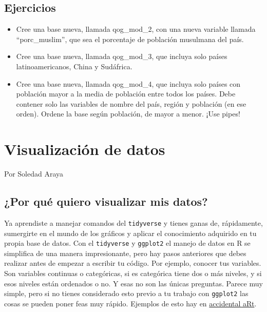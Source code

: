 \documentclass[]{book}
\providecommand{\tightlist}{%
  \setlength{\itemsep}{0pt}\setlength{\parskip}{0pt}}
\begin{document}
\hypertarget{ejercicios-1}{%
\section{Ejercicios}\label{ejercicios-1}}

\begin{itemize}
\tightlist
\item
  Cree una base nueva, llamada qog\_mod\_2, con una nueva variable
  llamada ``porc\_muslim'', que sea el porcentaje de población musulmana
  del país.
\item
  Cree una base nueva, llamada qog\_mod\_3, que incluya solo países
  latinoamericanos, China y Sudáfrica.
\item
  Cree una base nueva, llamada qog\_mod\_4, que incluya solo países con
  población mayor a la media de población entre todos los países. Debe
  contener solo las variables de nombre del país, región y población (en
  ese orden). Ordene la base según población, de mayor a menor. ¡Use
  pipes!
\end{itemize}

\hypertarget{dataviz}{%
\chapter{Visualización de datos}\label{dataviz}}

Por Soledad Araya

\hypertarget{por-que-quiero-visualizar-mis-datos}{%
\section{¿Por qué quiero visualizar mis
datos?}\label{por-que-quiero-visualizar-mis-datos}}

Ya aprendiste a manejar comandos del \texttt{tidyverse} y tienes ganas
de, rápidamente, sumergirte en el mundo de los gráficos y aplicar el
conocimiento adquirido en tu propia base de datos. Con el
\texttt{tidyverse} y \texttt{ggplot2} el manejo de datos en R se
simplifica de una manera impresionante, pero hay pasos anteriores que
debes realizar antes de empezar a escribir tu código. Por ejemplo,
conocer tus variables. Son variables continuas o categóricas, si es
categórica tiene dos o más niveles, y si esos niveles están ordenados o
no. Y esas no son las únicas preguntas. Parece muy simple, pero si no
tienes considerado esto previo a tu trabajo con \texttt{ggplot2} las
cosas se pueden poner feas muy rápido. Ejemplos de esto hay en
\href{https://twitter.com/accidental__aRt}{accidental aRt}.
\end{document}
